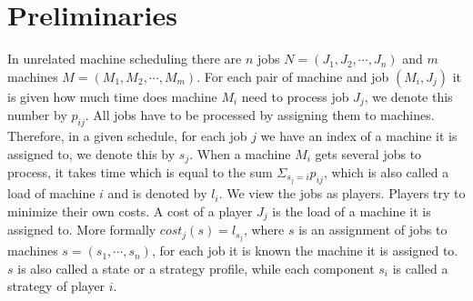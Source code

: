\documentclass[runningheads]{llncs}
\begin{document}

\section{Preliminaries}\label{sec:preli}
In unrelated machine scheduling there are $n$ jobs $N=(J_1,J_2,\cdots,J_n)$ and $m$ machines $M = (M_1,M_2,\cdots, M_m)$. For each pair of machine and job $(M_i,J_j)$ it is given how much time does machine $M_i$ need to process job $J_j$, we denote this number by $p_{ij}$. All jobs have to be processed by assigning them to machines. Therefore, in a given schedule, for each job $j$ we have an index of a machine it is assigned to, we denote this by $s_j$.
When a machine $M_i$ gets several jobs to process, it takes time which is equal to the sum  $\Sigma_{s_j=i}p_{ij}$, which is also called a load of machine $i$ and is denoted by $l_i$. We view the jobs as players. Players try to minimize their own costs. A cost of a player $J_j$ is the load of a machine it is assigned to. More formally $cost_j(s) = l_{s_j}$, where $s$ is an assignment of jobs to machines $s = (s_1, \cdots, s_n)$, for each job it is known the machine it is assigned to. $s$ is also called a state or a strategy profile, while each component $s_i$ is called a strategy of player $i$.
\end{document}
